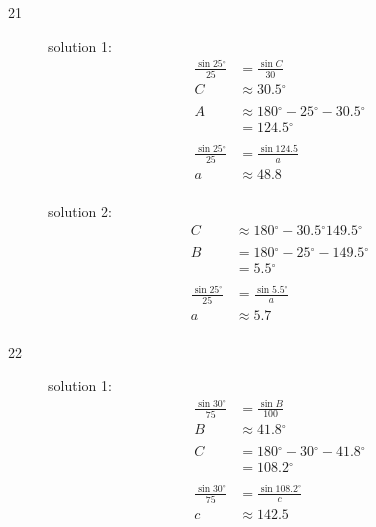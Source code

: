 \documentclass{exam}
\newcommand{\dg}{\ensuremath{^\circ}}
\begin{document}
\begin{description}
      \item[21] 
        solution 1:
        \begin{align*}
          \frac{\sin 25 \dg}{25} & = \frac{\sin C}{30} \\
          C                      & \approx \boxed{ 30.5 \dg } \\
          \\
          A & \approx 180 \dg - 25 \dg - 30.5 \dg \\
            & = \boxed{ 124.5 \dg } \\
          \\
          \frac{\sin 25 \dg}{25} & = \frac{\sin 124.5}{a} \\
          a                      & \approx \boxed{ 48.8 } \\
        \end{align*}

        solution 2:
        \begin{align*}
          C & \approx 180 \dg - 30.5 \dg \boxed{ 149.5 \dg } \\
          \\
          B & = 180 \dg - 25 \dg - 149.5 \dg \\
            & = \boxed{ 5.5 \dg } \\
          \\
          \frac{\sin 25 \dg}{25} & = \frac{\sin 5.5 \dg}{a} \\
          a                      & \approx \boxed{ 5.7 } \\
        \end{align*}

      \item[22] 
        solution 1:
        \begin{align*}
          \frac{\sin 30 \dg}{75} & = \frac{\sin B}{100} \\
          B                      & \approx \boxed{ 41.8 \dg } \\
          \\
          C & = 180 \dg - 30 \dg - 41.8 \dg \\
            & = \boxed{ 108.2 \dg } \\
          \\
          \frac{\sin 30 \dg}{75} & = \frac{\sin 108.2 \dg}{c} \\
          c                      & \approx \boxed{ 142.5 } \\
        \end{align*}


\end{description}
\end{document}
